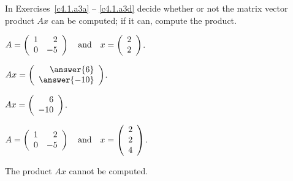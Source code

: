 \documentclass{ximera}
\begin{document}
\noindent In Exercises~\ref{c4.1.a3a} -- \ref{c4.1.a3d} decide whether or
not the matrix vector product $Ax$ can be computed; if it can, compute the
product.
\begin{exercise} \label{c4.1.a3a}
  $A=\left(\begin{array}{rr} 1 & 2\\ 0 &-5\end{array}\right) \quad\mbox{and}\quad x = \left(\begin{array}{r} 2 \\ 2\end{array}\right)$.
  \begin{multipleChoice}
  \end{multipleChoice}
  \begin{exercise}
    $Ax = \vectwo{\answer{6}}{\answer{-10}}$.

\begin{solution}
$Ax = \left(\begin{array}{r} 6 \\ -10\end{array}\right)$.

\end{solution}
  \end{exercise}

\begin{solution}


\end{solution}
\end{exercise}

\begin{exercise} \label{c4.1.a3b}
$A=\left(\begin{array}{rr} 1 & 2\\ 0 &-5\end{array}\right) \quad\mbox{and}\quad
x = \left(\begin{array}{r} 2\\ 2 \\4\end{array}\right)$.
  \begin{multipleChoice}
  \end{multipleChoice}

\begin{solution}
The product $Ax$ cannot be computed.

\end{solution}
\end{exercise}
\end{document}

